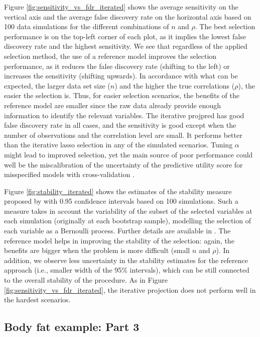 \documentclass[a4]{article}
\theoremstyle{definition}
\begin{document}
Figure \ref{fig:sensitivity_vs_fdr_iterated} shows the average sensitivity on
the vertical axis and the average false discovery rate on the
horizontal axis based on 100 data simulations for the different
combinations of $n$ and $\rho$. The best selection performance is on the
top-left corner of each plot, as it implies the lowest false discovery
rate and the highest sensitivity. We see that regardless of the
applied selection method, the use of a reference model improves the
selection performance, as it reduces the false discovery rate (shifting
to the left) or increases the sensitivity (shifting upwards). In
accordance with what can be expected, the larger data set size ($n$) and the higher the true correlations ($\rho$), the easier the
selection is. Thus, for easier selection scenarios, the benefits of
the reference model are smaller since the raw data already provide
enough information to identify the relevant variables. The iterative
projpred has good false discovery rate in all cases, and the
sensitivity is good except when the number of observations and the
correlation level are small. It performs better than the iterative lasso 
selection in any of the simulated scenarios. Tuning $\alpha$ might lead to improved
selection, yet the main source of poor performance could well be the
miscalibration of the uncertainty of the predictive utility score for
misspecified models with cross-validation \citep{bengio2004no}.


Figure \ref{fig:stability_iterated} shows the estimates of the stability
measure proposed by \cite{paper:stability} with 0.95 confidence
intervals based on 100 simulations. Such a measure takes in account
the variability of the subset of the selected variables at each
simulation (originally at each bootstrap sample), modelling the
selection of each variable as a Bernoulli process. Further details are
available in \cite{paper:stability}. The reference model helps in
improving the stability of the selection: again, the benefits are
bigger when the problem is more difficult (small $n$ and $\rho$). In
addition, we observe less uncertainty in the stability estimates for
the reference approach (i.e., smaller width of the 95\% intervals),
which can be still connected to the overall stability of the
procedure. As in Figure \ref{fig:sensitivity_vs_fdr_iterated}, the iterative
projection does not perform well in the hardest scenarios. 



\hypertarget{bodyfat-2}{%
\subsection{Body fat example: Part 3}\label{bodyfat-3}}
\end{document}
